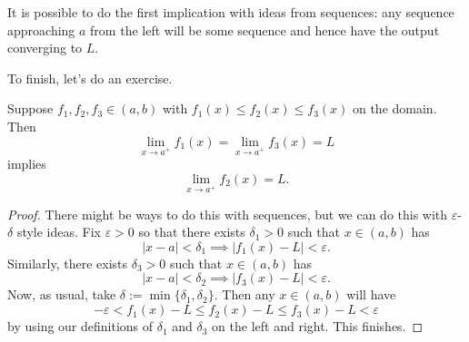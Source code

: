 \documentclass[../notes.tex]{subfiles}
\begin{document}
\begin{remark}
	It is possible to do the first implication with ideas from sequences: any sequence approaching $a$ from the left will be some sequence and hence have the output converging to $L.$
\end{remark}
To finish, let's do an exercise.
\begin{exercise}
	Suppose $f_1,f_2,f_3\in(a,b)$ with $f_1(x)\le f_2(x)\le f_3(x)$ on the domain. Then
	\[\lim_{x\to a^+}f_1(x)=\lim_{x\to a^+}f_3(x)=L\]
	implies
	\[\lim_{x\to a^+}f_2(x)=L.\]
\end{exercise}
\begin{proof}
	There might be ways to do this with sequences, but we can do this with $\varepsilon$-$\delta$ style ideas. Fix $\varepsilon>0$ so that there exists $\delta_1>0$ such that $x\in(a,b)$ has
	\[|x-a|<\delta_1\implies|f_1(x)-L|<\varepsilon.\]
	Similarly, there exists $\delta_3>0$ such that $x\in(a,b)$ has
	\[|x-a|<\delta_2\implies|f_3(x)-L|<\varepsilon.\]
	Now, as usual, take $\delta:=\min\{\delta_1,\delta_2\}.$ Then any $x\in(a,b)$ will have
	\[-\varepsilon<f_1(x)-L\le f_2(x)-L\le f_3(x)-L<\varepsilon\]
	by using our definitions of $\delta_1$ and $\delta_3$ on the left and right. This finishes.
\end{proof}
\end{document}
